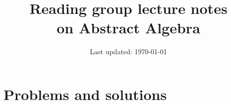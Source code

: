 \documentclass[a4paper, 12pt]{article}
\newcommand{\1}{\mathds{1}}	%
\theoremstyle{definition}
\begin{document}



\title{Reading group lecture notes \\[1em]
\normalsize on Abstract Algebra}


\author{\normalsize}
\date{\normalsize\vspace{-1ex} Last updated: \today}


\maketitle
\tableofcontents\label{sec:contents}



\newpage



\newpage
\section{Problems and solutions}



\newpage

\end{document}
